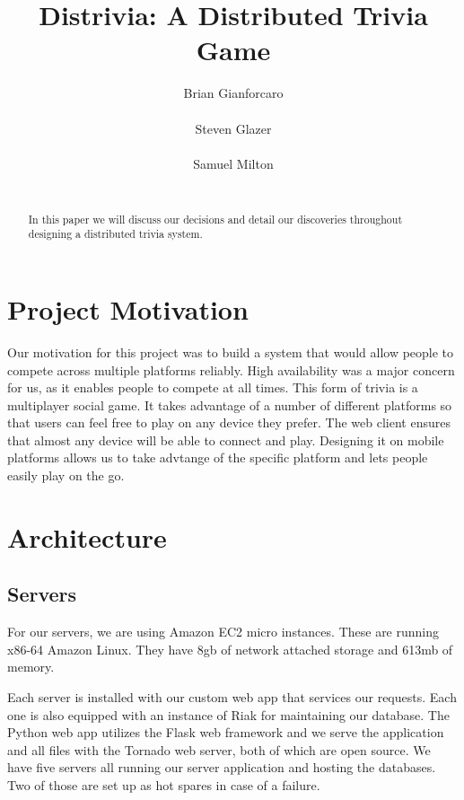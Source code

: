 \documentclass{dependencies/acm_proc_article-sp}
\begin{document}
\title{ Distrivia: A Distributed Trivia Game }
\author{
\alignauthor
Brian Gianforcaro \\
       \\
\alignauthor
Steven Glazer \\
       \\
\alignauthor
Samuel Milton \\
       \\
}
\maketitle

\begin{abstract}
In this paper we will discuss our decisions and detail our discoveries throughout designing a distributed trivia system.
\end{abstract}

\section{Project Motivation}
Our motivation for this project was to build a system that would allow people to compete across multiple platforms reliably.
High availability was a major concern for us, as it enables people to compete at all times.
This form of trivia is a multiplayer social game.
It takes advantage of a number of different platforms so that users can feel free to play on any device they prefer.
The web client ensures that almost any device will be able to connect and play.
Designing it on mobile platforms allows us to take advtange of the specific platform and lets people easily play on the go.
\section{Architecture}
\subsection{Servers}
For our servers, we are using Amazon EC2 micro instances.
These are running x86-64 Amazon Linux.
They have 8gb of network attached storage and 613mb of memory.

Each server is installed with our custom web app that services our requests.
Each one is also equipped with an instance of Riak for maintaining our database.
The Python web app utilizes the Flask web framework and we serve the application and all files with the Tornado web server, both of which are open source.
We have five servers all running our server application and hosting the databases.
Two of those are set up as hot spares in case of a failure.
\end{document}
